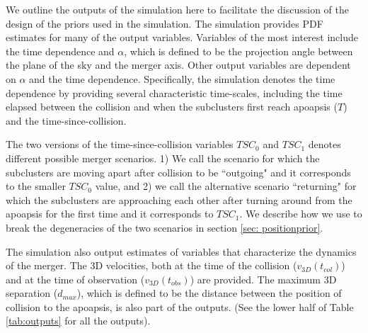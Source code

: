 We outline the outputs of the simulation here to facilitate the discussion
of the design of the priors used in the simulation. The simulation
provides PDF estimates for many of the output variables. Variables
of the most interest include the time dependence and $\alpha$, which is
defined to be the projection angle between the plane of the sky and the merger axis. Other output variables are dependent on $\alpha$ and the time
dependence. Specifically, the simulation denotes the time dependence by
providing several characteristic time-scales, including the time
elapsed between the collision and when the subclusters first reach apoapsis
($T$) and the time-since-collision.  

The two versions of the time-since-collision variables $TSC_0$ and
$TSC_1$ denotes different possible merger scenarios. 1) We call the scenario for which the subclusters are
moving apart after collision to be ``outgoing" and it corresponds to the
smaller $TSC_0$ value, and 2) we call the alternative scenario 
``returning" for which the subclusters are approaching each other after turning
around from the apoapsis for the first time and it corresponds to $TSC_1$.
We describe how we use to break the degeneracies of the two scenarios in
section \ref{sec: positionprior}. 
 
The simulation also output estimates of variables that characterize
the dynamics of the merger. The 3D velocities, both at the time of the
collision ($v_{3D}(t_{col})$) and at the time of observation
($v_{3D}(t_{obs})$) are provided. The maximum 3D separation ($d_{max}$),
which is defined to be the distance between the position of collision to
the apoapsis, is also part of
the outputs. (See the lower half of Table \ref{tab:outputs} for all the outputs).
%

